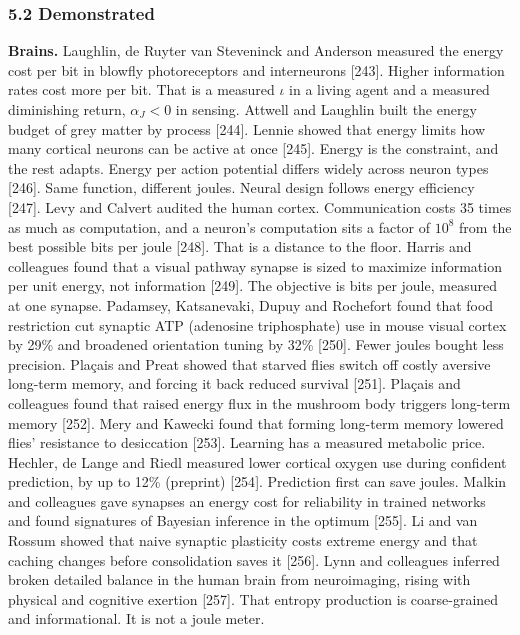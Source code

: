 \documentclass[
  10pt,
]{article}
\begin{document}
\subsubsection{5.2 Demonstrated}\label{demonstrated-2}

\textbf{Brains.} Laughlin, de Ruyter van Steveninck and Anderson
measured the energy cost per bit in blowfly photoreceptors and
interneurons {[}243{]}. Higher information rates cost more per bit. That
is a measured \(\iota\) in a living agent and a measured diminishing
return, \(\alpha_J < 0\) in sensing. Attwell and Laughlin built the
energy budget of grey matter by process {[}244{]}. Lennie showed that
energy limits how many cortical neurons can be active at once {[}245{]}.
Energy is the constraint, and the rest adapts. Energy per action
potential differs widely across neuron types {[}246{]}. Same function,
different joules. Neural design follows energy efficiency {[}247{]}.
Levy and Calvert audited the human cortex. Communication costs 35 times
as much as computation, and a neuron's computation sits a factor of
\(10^8\) from the best possible bits per joule {[}248{]}. That is a
distance to the floor. Harris and colleagues found that a visual pathway
synapse is sized to maximize information per unit energy, not
information {[}249{]}. The objective is bits per joule, measured at one
synapse. Padamsey, Katsanevaki, Dupuy and Rochefort found that food
restriction cut synaptic ATP (adenosine triphosphate) use in mouse
visual cortex by 29\% and broadened orientation tuning by 32\%
{[}250{]}. Fewer joules bought less precision. Plaçais and Preat showed
that starved flies switch off costly aversive long-term memory, and
forcing it back reduced survival {[}251{]}. Plaçais and colleagues found
that raised energy flux in the mushroom body triggers long-term memory
{[}252{]}. Mery and Kawecki found that forming long-term memory lowered
flies' resistance to desiccation {[}253{]}. Learning has a measured
metabolic price. Hechler, de Lange and Riedl measured lower cortical
oxygen use during confident prediction, by up to 12\% (preprint)
{[}254{]}. Prediction first can save joules. Malkin and colleagues gave
synapses an energy cost for reliability in trained networks and found
signatures of Bayesian inference in the optimum {[}255{]}. Li and van
Rossum showed that naive synaptic plasticity costs extreme energy and
that caching changes before consolidation saves it {[}256{]}. Lynn and
colleagues inferred broken detailed balance in the human brain from
neuroimaging, rising with physical and cognitive exertion {[}257{]}.
That entropy production is coarse-grained and informational. It is not a
joule meter.
\end{document}
